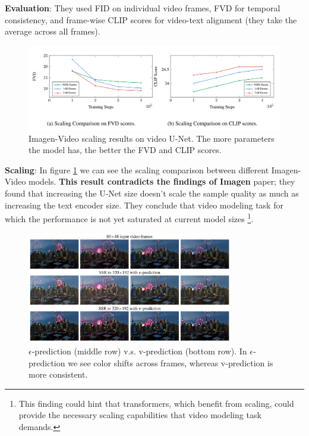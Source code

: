 \textbf{Evaluation}: They used FID on individual video frames, FVD for temporal consistency, and frame-wise CLIP scores for video-text alignment (they take the average across all frames).

\begin{figure}
    \centering
    \includegraphics[width=1\textwidth]{images/imagen_video/scaling.png}
    \caption{Imagen-Video scaling results on video U-Net. The more parameters the model has, the better the FVD and CLIP scores.}
    \label{fig:imagen_video_scaling}
\end{figure}

\textbf{Scaling}: In figure \ref{fig:imagen_video_scaling} we can see the scaling comparison between different Imagen-Video models. \textbf{This result contradicts the findings of Imagen} \cite{imagen} paper; they found that increasing the U-Net size doesn't scale the sample quality as much as increasing the text encoder size. They conclude that video modeling task for which the performance is not yet saturated at current model sizes \footnote{This finding could hint that transformers, which benefit from scaling, could provide the necessary scaling capabilities that video modeling task demands.}.

\begin{figure}
    \centering
    \includegraphics[width=0.8\textwidth]{images/imagen_video/e_prediction_vs_v_prediction.png}
    \caption{$\epsilon$-prediction (middle row) v.s. v-prediction (bottom row). In $\epsilon$-prediction we see color shifts across frames, whereas v-prediction is more consistent.}
    \label{fig:imagen_video_epsilon_prediction_vs_v_prediction}
\end{figure}

